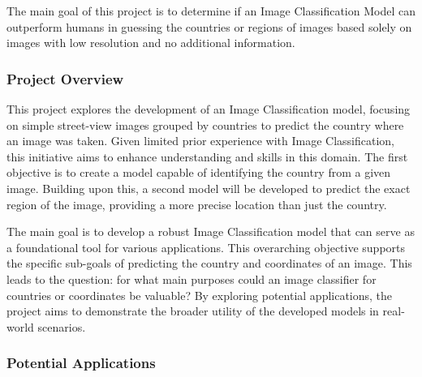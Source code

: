 \documentclass{article}
\begin{document}
The main goal of this project is to determine if an Image Classification
Model can outperform humans in guessing the countries or regions of
images based solely on images with low resolution and no additional
information.

\subsubsection{Project Overview}\label{project-overview}

This project explores the development of an Image Classification model,
focusing on simple street-view images grouped by countries to predict
the country where an image was taken. Given limited prior experience
with Image Classification, this initiative aims to enhance understanding
and skills in this domain. The first objective is to create a model
capable of identifying the country from a given image. Building upon
this, a second model will be developed to predict the exact region of
the image, providing a more precise location than just the country.

The main goal is to develop a robust Image Classification model that can
serve as a foundational tool for various applications. This overarching
objective supports the specific sub-goals of predicting the country and
coordinates of an image. This leads to the question: for what main
purposes could an image classifier for countries or coordinates be
valuable? By exploring potential applications, the project aims to
demonstrate the broader utility of the developed models in real-world
scenarios.

\subsubsection{Potential Applications}\label{potential-applications}
\end{document}
